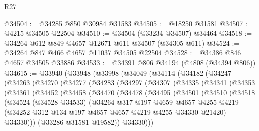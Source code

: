 \begin{lexlean}{R27}
\begin{coremodule}
@34504 := @34285 @850 @30984 @31583
@34505 := @18250 @31581
@34507 := @4215 @34505 @22504
@34510 := @34504 (@33234 @34507) @34464
@34518 := @34264 @612 @849 @4657 @12671 @611 @34507 (@34305 @611)
@34524 := @34264 @847 @466 @4657 @11037 @34505 @22504
@34528 := @34386 @846 @4657 @34505 @33886
@34533 := @34391 @806 @34194 (@4808 (@34394 @806))
@34615 := @33940
    (@33948
      (@33998
        (@34049
          (@34114
            (@34182
              (@34247
                (@34263
                  (@34270
                    (@34277
                      (@34283
                        (@34297
                          (@34307
                            (@34335
                              (@34341
                                (@34353
                                  (@34361
                                    (@34452
                                      (@34458
                                        (@34470
                                          (@34478
                                            (@34495
                                              (@34501
                                                (@34510
                                                  (@34518
                                                    (@34524
                                                      (@34528 @34533)
                                                      (@34264
                                                        @317
                                                        @197
                                                        @4659
                                                        @4657
                                                        @4255
                                                        @4219
                                                        (@34252
                                                          @312
                                                          @134
                                                          @197
                                                          @4657
                                                          @4657
                                                          @4219
                                                          @4255
                                                          @34330
                                                          @21420)
                                                        @34330)))
                                                  (@33286 @31581 @19582))
                                                @34330)))

\end{coremodule}
\end{lexlean}
